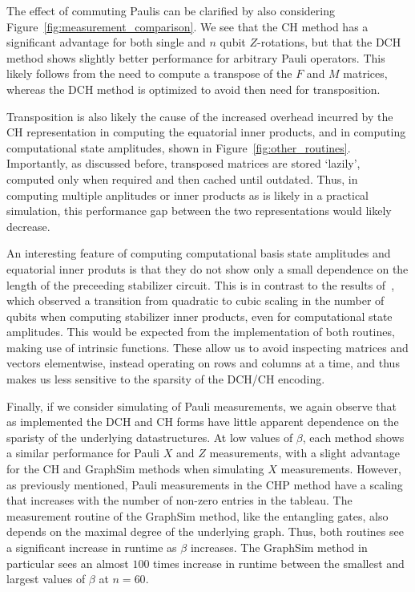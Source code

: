 The effect of commuting Paulis can be clarified by also considering Figure~\ref{fig:measurement_comparison}. We see that the CH method has a significant advantage for both single and $n$ qubit $Z$-rotations, but that the DCH method shows slightly better performance for arbitrary Pauli operators. This likely follows from the need to compute a transpose of the $F$ and $M$ matrices, whereas the DCH method is optimized to avoid then need for transposition.\par
Transposition is also likely the cause of the increased overhead incurred by the CH representation in computing the equatorial inner products, and in computing computational state amplitudes, shown in Figure~\ref{fig:other_routines}. Importantly, as discussed before, transposed matrices are stored `lazily', computed only when required and then cached until outdated. Thus, in computing multiple anplitudes or inner products as is likely in a practical simulation, this performance gap between the two representations would likely decrease.\par
An interesting feature of computing computational basis state amplitudes and equatorial inner produts is that they do not show only a small dependence on the length of the preceeding stabilizer circuit. This is in contrast to the results of~\cite{Garcia2012}, which observed a transition from quadratic to cubic scaling in the number of qubits when computing stabilizer inner products, even for computational state amplitudes. This would be expected from the implementation of both routines, making use of intrinsic functions. These allow us to avoid inspecting matrices and vectors elementwise, instead operating on rows and columns at a time, and thus makes us less sensitive to the sparsity of the DCH/CH encoding.\par 
Finally, if we consider simulating of Pauli measurements, we again observe that as implemented the DCH and CH forms have little apparent dependence on the sparisty of the underlying datastructures. At low values of $\beta$, each method shows a similar performance for Pauli $X$ and $Z$ measurements, with a slight advantage for the CH and GraphSim methods when simulating $X$ measurements. However, as previously mentioned, Pauli measurements in the CHP method have a scaling that increases with the number of non-zero entries in the tableau. The measurement routine of the GraphSim method, like the entangling gates, also depends on the maximal degree of the underlying graph. Thus, both routines see a significant increase in runtime as $\beta$ increases. The GraphSim method in particular sees an almost $100$ times increase in runtime between the smallest and largest values of $\beta$ at $n=60$.\par
